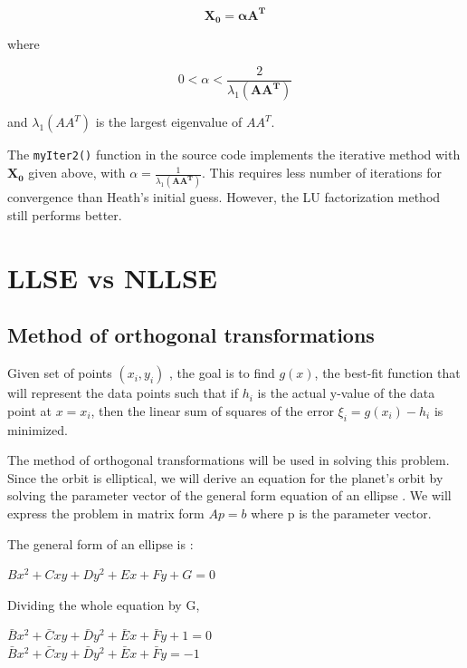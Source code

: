 \documentclass[a4paper]{article}
\begin{document}
			$$
			\mathbf{X_{0}=\alpha A^{T}}
			$$
			
			\begin{center}
			where
			\end{center}
			$$
				0 < \alpha < \frac{2}{\lambda_{1}(\mathbf{AA^{T}})}
			$$
			
			\begin{center}
			and $\lambda_{1}(AA^{T})$ is the largest eigenvalue of $AA^{T}$.
			\end{center}
			The \texttt{myIter2()} function in the source code implements the iterative method with $\mathbf{X_{0}}$ given above, with $\alpha = \frac{1}{\lambda_{1}(\mathbf{AA^{T}})}$.
			This requires less number of iterations for convergence than Heath's initial guess.
			However, the LU factorization method still performs better.



\section{LLSE vs NLLSE}
	\subsection{Method of orthogonal transformations}
	 Given set of points $(x_{i},y_{i})$ , the goal is to find  $g(x)$, the best-fit function that will represent the data points such that  if  $h_{i}$  is the actual y-value of the data point at $x = x_{i}$, then the linear sum of squares of the error $\xi_{i} = g(x_{i})-h_{i}$ is minimized.

	The method of orthogonal transformations will be used in solving this problem. Since the orbit is elliptical, we will derive an equation for the planet's orbit by solving the parameter vector of the general form equation of an ellipse . We will express the problem in matrix form $Ap = b$ where p is the parameter vector. 

The general form of an ellipse is : 

	\begin{center}
	$Bx^{2} + Cxy + Dy^{2} + Ex + Fy + G= 0$
	\end{center}

Dividing the whole equation by G,

	\begin{center}
		$\bar{B}x^{2} + \bar{C}xy + \bar{D}y^{2} + \bar{E}x + \bar{F}y + 1= 0 $ \\
		$\bar{B}x^{2} + \bar{C}xy + \bar{D}y^{2} + \bar{E}x + \bar{F}y = -1 $
	\end{center}
\end{document}

